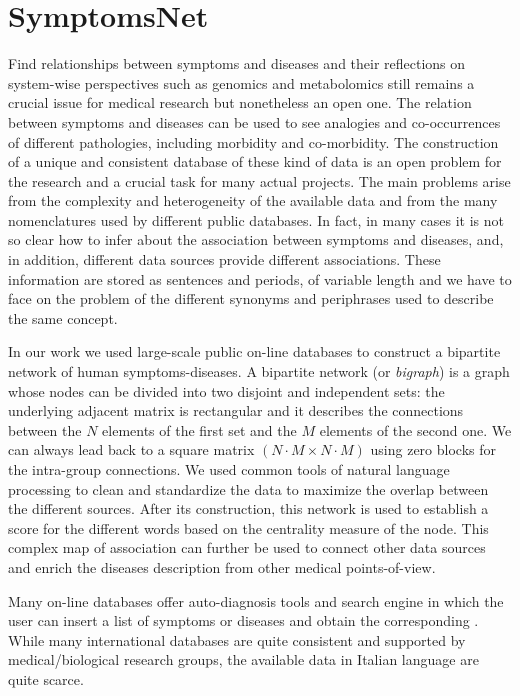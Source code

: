 \documentclass{standalone}
\begin{document}
\section[SymptomsNet]{SymptomsNet}\label{chimera:symptomsnet}

Find relationships between symptoms and diseases and their reflections on system-wise perspectives such as genomics and metabolomics still remains a crucial issue for medical research but nonetheless an open one.
The relation between symptoms and diseases can be used to see analogies and co-occurrences of different pathologies, including morbidity and co-morbidity.
The construction of a unique and consistent database of these kind of data is an open problem for the research and a crucial task for many actual projects.
The main problems arise from the complexity and heterogeneity of the available data and from the many nomenclatures used by different public databases.
In fact, in many cases it is not so clear how to infer about the association between symptoms and diseases, and, in addition, different data sources provide different associations.
These information are stored as sentences and periods, of variable length and we have to face on the problem of the different synonyms and periphrases used to describe the same concept.

In our work we used large-scale public on-line databases to construct a bipartite network of human symptoms-diseases.
A bipartite network (or \emph{bigraph}) is a graph whose nodes can be divided into two disjoint and independent sets: the underlying adjacent matrix is rectangular and it describes the connections between the $N$ elements of the first set and the $M$ elements of the second one.
We can always lead back to a square matrix $(N\cdot M \times N\cdot M)$ using zero blocks for the intra-group connections.
We used common tools of natural language processing to clean and standardize the data to maximize the overlap between the different sources.
After its construction, this network is used to establish a score for the different words based on the centrality measure of the node.
This complex map of association can further be used to connect other data sources and enrich the diseases description from other medical points-of-view.

Many on-line databases offer auto-diagnosis tools and search engine in which the user can insert a list of symptoms or diseases and obtain the corresponding .
While many international databases are quite consistent and supported by medical/biological research groups, the available data in Italian language are quite scarce.
\end{document}
